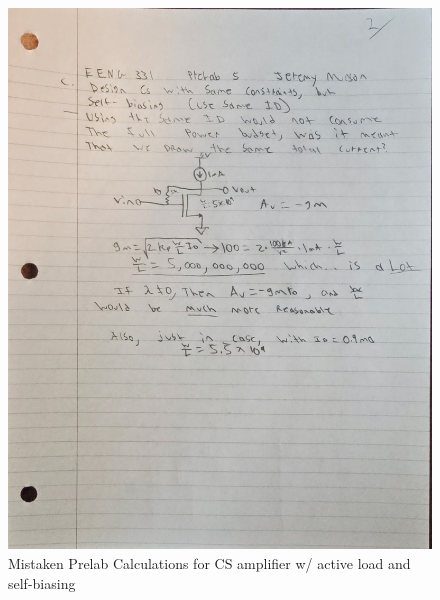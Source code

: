 \documentclass[11pt]{article}
\begin{document}
	\begin{figure}
	\centering
		\includegraphics[width=0.95\linewidth]{prelab2}
		\caption{Mistaken Prelab Calculations for CS amplifier w/ active load and self-biasing}
		\label{fig:prelab2}
	\end{figure}

\FloatBarrier
	
	\newpage
	\setcounter{tocdepth}{2}
	\begin{spacing}{0.1}
		\tableofcontents
		\listoffigures
	\end{spacing}
\end{document}

